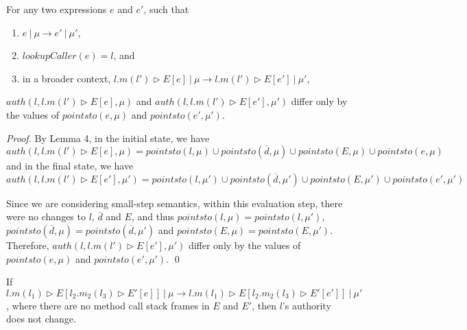 \documentclass{llncs}
\begin{document}
\begin{lemma}
For any two expressions $e$ and $e'$, such that
\begin{enumerate}
\item $e~|~\mu \longrightarrow e'~|~\mu'$,
\item $lookupCaller(e) = l$, and
\item in a broader context, $l.m(l') \rhd E[e]~|~\mu \longrightarrow l.m(l') \rhd E[e']~|~\mu'$,
\end{enumerate}
$auth(l, l.m(l') \rhd E[e], \mu)$ and $auth(l, l.m(l') \rhd E[e'], \mu')$ differ only by the values of $pointsto(e, \mu)$ and $pointsto(e', \mu')$.
\end{lemma}

\begin{proof} By Lemma 4, in the initial state, we have
\[
auth(l, l.m(l') \rhd E[e], \mu) = pointsto(l, \mu) \cup pointsto(\overline{d}, \mu) \cup pointsto(E, \mu) \cup pointsto(e, \mu)
\]
and in the final state, we have
\[
auth(l, l.m(l') \rhd E[e'], \mu') = pointsto(l, \mu') \cup pointsto(\overline{d}, \mu') \cup pointsto(E, \mu') \cup pointsto(e', \mu')
\]

Since we are considering small-step semantics, within this evaluation step, there were no changes to $l$, $\overline{d}$ and $E$, and thus $pointsto(l, \mu) = pointsto(l, \mu')$, $pointsto(\overline{d}, \mu) = pointsto(\overline{d}, \mu')$ and $pointsto(E, \mu) = pointsto(E, \mu')$. Therefore, $auth(l, l.m(l') \rhd E[e'], \mu')$ differ only by the values of $pointsto(e, \mu)$ and $pointsto(e', \mu')$. \qed

\end{proof}

\newpage
\begin{lemma}
If 
\mbox{$l.m(l_1) \rhd E[l_2.m_2(l_3) \rhd E'[e]]~|~\mu \longrightarrow l.m(l_1) \rhd E[l_2.m_2(l_3) \rhd E'[e']]~|~\mu'$}, where there are no method call stack frames in $E$ and $E'$, then $l$'s authority does not change.
\end{lemma}
\end{document}
